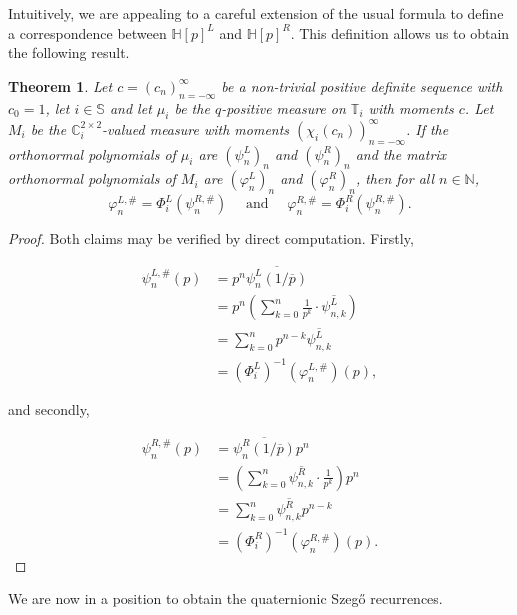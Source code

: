 \documentclass[11pt,reqno]{amsart}
\def\x{\chi}
\def\p{\varphi}
\def\q{\psi}
\def\P{\Phi}
\def\NN{\mathbb{N}}
\def\CC{\mathbb{C}}
\def\SS{\mathbb{S}}
\def\TT{\mathbb{T}}
\def\HH{\mathbb{H}}
\newtheorem{theorem}{Theorem}[section]
\theoremstyle{definition}
\numberwithin{equation}{section}
\begin{document}
Intuitively, we are appealing to a careful extension of the usual formula to define a correspondence between \(\HH[p]^L\) and \(\HH[p]^R\). This definition allows us to obtain the following result.

\begin{theorem}
	Let \(c = (c_n)_{n=-\infty}^{\infty}\) be a non-trivial positive definite sequence with \(c_0 = 1\), let \(i \in \SS\) and let \(\mu_i\) be the \(q\)-positive measure on \(\TT_i\) with moments \(c\). Let \(M_i\) be the \(\CC_i^{2\times2}\)-valued measure with moments \((\x_i(c_n))_{n=-\infty}^{\infty}\). If the orthonormal polynomials of \(\mu_i\) are \((\q_n^L)_n\) and \((\q_n^R)_n\) and the matrix orthonormal polynomials of \(M_i\) are \((\p_n^L)_n\) and \((\p_n^R)_n\), then for all \(n \in \NN\),
	\[
		\p_n^{L,\#} = \P_i^L(\q_n^{R,\#}) \quad \text{ and } \quad \p_n^{R,\#} = \P_i^R(\q_n^{R,\#}).
	\]
\end{theorem}
\begin{proof}
	Both claims may be verified by direct computation. Firstly,

	\begin{align*}
	    \q_n^{L,\#}(p) & = p^n \overline{\q_n^L(1/\overline{p})} \\
	    & = p^n\left(\sum_{k=0}^n \frac{1}{p^k} \cdot \overline{\q_{n,k}^L}\right) \\
	    & = \sum_{k=0}^n p^{n-k} \overline{\q_{n,k}^L} \\
	    & = (\P_i^L)^{-1}(\p_n^{L,\#})(p),
	\end{align*}

	and secondly,
	
	\begin{align*}
	    \q_n^{R,\#}(p) & = \overline{\q_n^R(1/\overline{p})} p^n \\
	    & = \left( \sum_{k=0}^n \overline{\q_{n,k}^R} \cdot \frac{1}{p^k} \right) p^n \\
	    & = \sum_{k=0}^{n} \overline{\q_{n,k}^R} p^{n-k} \\
	    & = (\P_i^R)^{-1}(\p_n^{R,\#})(p).
	\end{align*}
\end{proof}

We are now in a position to obtain the quaternionic Szeg\H{o} recurrences.
\end{document}
